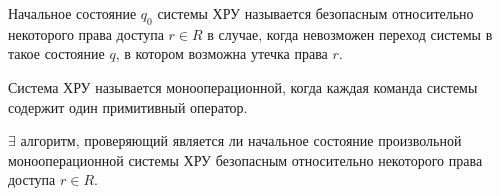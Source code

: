 \begin{defs}
	Начальное состояние $q_0$ системы ХРУ называется безопасным относительно некоторого права доступа $r \in R$ в случае, когда невозможен переход
	системы в такое состояние $q$, в котором возможна утечка права $r$.
\end{defs}

\begin{defs}
	Система ХРУ называется монооперационной, когда каждая команда системы содержит один примитивный оператор.
\end{defs}

\begin{proofs}
	$\exists$ алгоритм, проверяющий является ли начальное состояние произвольной монооперационной системы ХРУ безопасным относительно некоторого
	права доступа $r \in R$.
\end{proofs}

